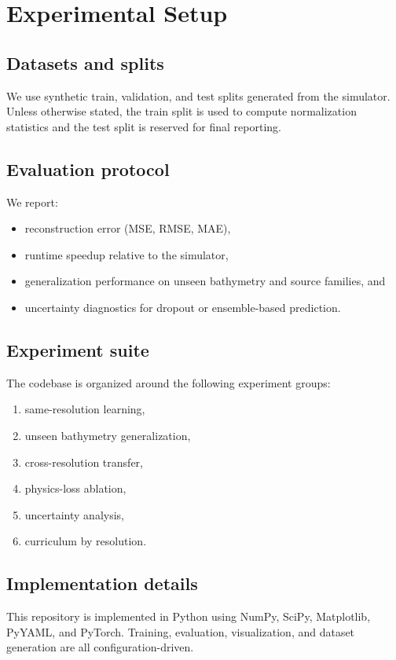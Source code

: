 \section{Experimental Setup}

\subsection{Datasets and splits}
We use synthetic train, validation, and test splits generated from the simulator. Unless otherwise stated, the train split is used to compute normalization statistics and the test split is reserved for final reporting.

\subsection{Evaluation protocol}
We report:
\begin{itemize}[leftmargin=1.5em]
    \item reconstruction error (MSE, RMSE, MAE),
    \item runtime speedup relative to the simulator,
    \item generalization performance on unseen bathymetry and source families, and
    \item uncertainty diagnostics for dropout or ensemble-based prediction.
\end{itemize}

\subsection{Experiment suite}
The codebase is organized around the following experiment groups:
\begin{enumerate}[leftmargin=1.5em]
    \item same-resolution learning,
    \item unseen bathymetry generalization,
    \item cross-resolution transfer,
    \item physics-loss ablation,
    \item uncertainty analysis,
    \item curriculum by resolution.
\end{enumerate}

\subsection{Implementation details}
This repository is implemented in Python using NumPy, SciPy, Matplotlib, PyYAML, and PyTorch. Training, evaluation, visualization, and dataset generation are all configuration-driven.
